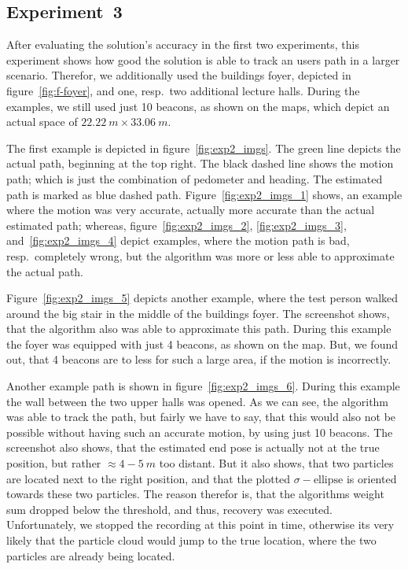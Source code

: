 \subsection*{Experiment~3}
After evaluating the solution's accuracy in the first two experiments, this experiment shows how good the solution is able to track an users path in a larger scenario. Therefor, we additionally used the buildings foyer, depicted in figure~\ref{fig:f-foyer}, and one, resp.\ two additional lecture halls. During the examples, we still used just 10 beacons, as shown on the maps, which depict an actual space of $22.22~m \times 33.06~m$.

The first example is depicted in figure~\ref{fig:exp2_imgs}. The green line depicts the actual path, beginning at the top right. The black dashed line shows the motion path; which is just the combination of pedometer and heading. The estimated path is marked as blue dashed path. Figure~\ref{fig:exp2_imgs_1} shows, an example where the motion was very accurate, actually more accurate than the actual estimated path; whereas, figure~\ref{fig:exp2_imgs_2}, \ref{fig:exp2_imgs_3}, and~\ref{fig:exp2_imgs_4} depict examples, where the motion path is bad, resp.\ completely wrong, but the algorithm was more or less able to approximate the actual path.

Figure~\ref{fig:exp2_imgs_5} depicts another example, where the test person walked around the big stair in the middle of the buildings foyer. The screenshot shows, that the algorithm also was able to approximate this path. During this example the foyer was equipped with just 4 beacons, as shown on the map. But, we found out, that 4 beacons are to less for such a large area, if the motion is incorrectly.

Another example path is shown in figure~\ref{fig:exp2_imgs_6}. During this example the wall between the two upper halls was opened. As we can see, the algorithm was able to track the path, but fairly we have to say, that this would also not be possible without having such an accurate motion, by using just 10 beacons. The screenshot also shows, that the estimated end pose is actually not at the true position, but rather $\approx 4-5~m$ too distant. But it also shows, that two particles are located next to the right position, and that the plotted $\sigma-\text{ellipse}$ is oriented towards these two particles.  The reason therefor is, that the algorithms weight sum dropped below the threshold, and thus, recovery was executed. Unfortunately, we stopped the recording at this point in time, otherwise its very likely that the particle cloud would jump to the true location, where the two particles are already being located. 


